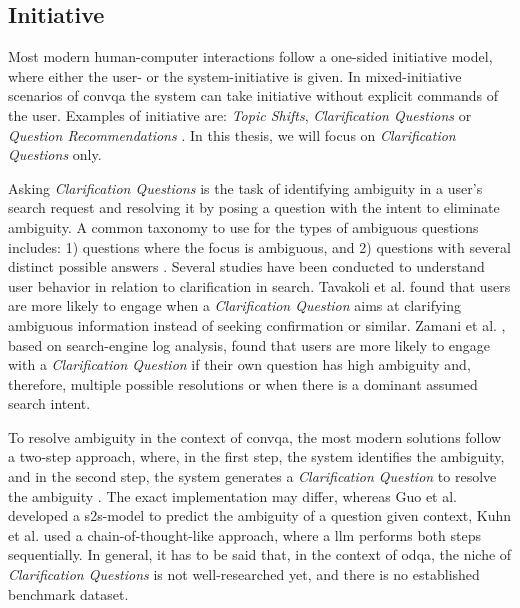 \subsection{Initiative}
\label{subsec:cqa_initiative}

Most modern human-computer interactions follow a one-sided initiative model, where either the user- or the system-initiative is given. In mixed-initiative scenarios of \gls{convqa} the system can take initiative without explicit commands of the user. Examples of initiative are: \textit{Topic Shifts}, \textit{Clarification Questions} or \textit{Question Recommendations} \cite{zamani_conversational_2023}. In this thesis, we will focus on \textit{Clarification Questions} only.

Asking \textit{Clarification Questions} is the task of identifying ambiguity in a user's search request and resolving it by posing a question with the intent to eliminate ambiguity. A common taxonomy to use for the types of ambiguous questions includes: 1) questions where the focus is ambiguous, and 2) questions with several distinct possible answers \cite{larsson_issue-based_2002}. Several studies have been conducted to understand user behavior in relation to clarification in search. Tavakoli et al. \cite{tavakoli_analyzing_2021} found that users are more likely to engage when a \textit{Clarification Question} aims at clarifying ambiguous information instead of seeking confirmation or similar. Zamani et al. \cite{zamani_analyzing_2020}, based on search-engine log analysis, found that users are more likely to engage with a \textit{Clarification Question} if their own question has high ambiguity and, therefore, multiple possible resolutions or when there is a dominant assumed search intent.

To resolve ambiguity in the context of \gls{convqa}, the most modern solutions follow a two-step approach, where, in the first step, the system identifies the ambiguity, and in the second step, the system generates a \textit{Clarification Question} to resolve the ambiguity \cite{kuhn_clam_2023, guo_abg-coqa_nodate}. The exact implementation may differ, whereas Guo et al. \cite{guo_abg-coqa_nodate} developed a \gls{s2s}-model to predict the ambiguity of a question given context, Kuhn et al. \cite{kuhn_clam_2023} used a chain-of-thought-like approach, where a \gls{llm} performs both steps sequentially. In general, it has to be said that, in the context of \gls{odqa}, the niche of \textit{Clarification Questions} is not well-researched yet, and there is no established benchmark dataset.

